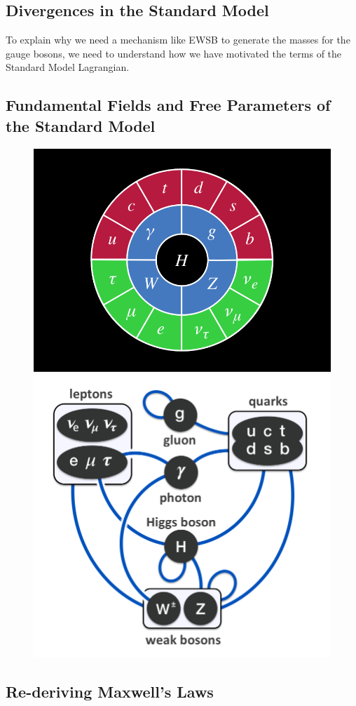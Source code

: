 \subsection{Divergences in the Standard Model} 

To explain why we need a mechanism like EWSB to generate the masses for the gauge bosons, we need to understand how we
have motivated the terms of the Standard Model Lagrangian. 

\subsection{Fundamental Fields and Free Parameters of the Standard Model}

\begin{figure}
\begin{center}
\includegraphics[width=.45\textwidth]{pics/sm_model_particles}
\includegraphics[width=.45\textwidth]{pics/principal_interactions}
\caption{}
\end{center}
\end{figure}





\subsection{Re-deriving Maxwell's Laws} 

